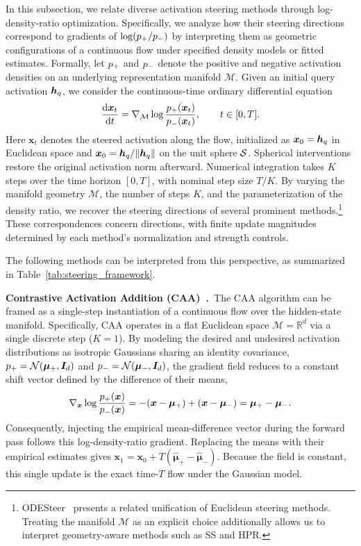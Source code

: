 In this subsection, we relate diverse activation steering methods through log-density-ratio optimization. Specifically, we analyze how their steering directions correspond to gradients of $\log(p_{+}/p_{-})$ by interpreting them as geometric configurations of a continuous flow under specified density models or fitted estimates. Formally, let $p_{+}$ and $p_{-}$ denote the positive and negative activation densities on an underlying representation manifold $\mathcal{M}$. Given an initial query activation $\boldsymbol{h}_{q}$, we consider the continuous-time ordinary differential equation
\begin{equation}
\frac{\mathrm{d}\boldsymbol{x}_t}{\mathrm{d}t}
=\nabla_{\mathcal{M}}\log\frac{p_{+}(\boldsymbol{x}_t)}{p_{-}(\boldsymbol{x}_t)},
\qquad t\in[0,T].
\label{eq:baseline-ldr-flow}
\end{equation}
Here $\boldsymbol{x}_t$ denotes the steered activation along the flow, initialized as $\boldsymbol{x}_0=\boldsymbol{h}_{q}$ in Euclidean space and $\boldsymbol{x}_0=\boldsymbol{h}_{q}/\|\boldsymbol{h}_{q}\|$ on the unit sphere $\mathcal{S}$. Spherical interventions restore the original activation norm afterward. Numerical integration takes $K$ steps over the time horizon $[0,T]$, with nominal step size $T/K$. By varying the manifold geometry $\mathcal{M}$, the number of steps $K$, and the parameterization of the density ratio, we recover the steering directions of several prominent methods.\footnote{ODESteer~\citep{zhaoodesteer} presents a related unification of Euclidean steering methods. Treating the manifold $\mathcal{M}$ as an explicit choice additionally allows us to interpret geometry-aware methods such as SS and HPR.} These correspondences concern directions, with finite update magnitudes determined by each method's normalization and strength controls.

The following methods can be interpreted from this perspective, as summarized in Table~\ref{tab:steering_framework}.

\noindent\textbf{Contrastive Activation Addition (CAA)~\citep{rimsky2024steering}.}~The CAA algorithm can be framed as a single-step instantiation of a continuous flow over the hidden-state manifold. Specifically, CAA operates in a flat Euclidean space $\mathcal{M}=\mathbb{R}^d$ via a single discrete step ($K=1$). By modeling the desired and undesired activation distributions as isotropic Gaussians sharing an identity covariance, $p_{+}=\mathcal{N}(\boldsymbol{\mu}_+,\boldsymbol{I}_d)$ and $p_{-}=\mathcal{N}(\boldsymbol{\mu}_-,\boldsymbol{I}_d)$, the gradient field reduces to a constant shift vector defined by the difference of their means,
\[
\nabla_{\boldsymbol{x}}\log\frac{p_{+}(\boldsymbol{x})}{p_{-}(\boldsymbol{x})}
=-(\boldsymbol{x}-\boldsymbol{\mu}_+)+(\boldsymbol{x}-\boldsymbol{\mu}_-)
=\boldsymbol{\mu}_+-\boldsymbol{\mu}_-.
\]
Consequently, injecting the empirical mean-difference vector during the forward pass follows this log-density-ratio gradient. Replacing the means with their empirical estimates gives $\boldsymbol{x}_1=\boldsymbol{x}_0+T(\widehat{\boldsymbol{\mu}}_+-\widehat{\boldsymbol{\mu}}_-)$. Because the field is constant, this single update is the exact time-$T$ flow under the Gaussian model.

